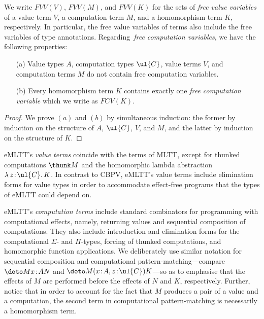 We write $FVV(V)$, $FVV(M)$, and $FVV(K)$ 
for the sets of \emph{free value variables} of a value term $V$, a computation term $M$, and a homomorphism term $K$, respectively. In particular, the free value variables of terms also include the free variables of type annotations. Regarding\, \emph{free computation variables}, we have the following properties:

\begin{proposition}
\mbox{}
\begin{enumerate}
\item[(a)] Value types $A$, computation types $\ul{C}$, value terms $V$, and computation terms $M$ do not contain free computation variables.
\item[(b)] Every homomorphism term $K$ contains exactly one \emph{free computation variable} which we write  as $FCV(K)$.
\end{enumerate}
\end{proposition}

\begin{proof}
We prove $(a)$ and $(b)$ by simultaneous induction: the former by induction on the structure of $A$, $\ul{C}$, $V$, and $M$, and the latter by induction on the structure of $K$.
\end{proof}

eMLTT's \emph{value terms} coincide with the terms of MLTT, except for thunked computations 
$\thunk M$ and the homomorphic lambda abstraction $ \lambda\, z \!:\! \ul{C} .\, K$. 
In contrast to CBPV, eMLTT's value terms include elimination forms for value types  
in order to accommodate effect-free programs that the types of eMLTT could depend on.

eMLTT's \emph{computation terms} include standard combinators for programming with computational effects, namely, returning values and sequential composition of computations. They also include introduction and elimination forms for the computational $\Sigma$- and $\Pi$-types, forcing of thunked computations, and homomorphic function applications. 
We deliberately use similar notation for sequential composition and computational pattern-matching---compare $\doto M {x \!:\! A} {} N$ and $\doto M {(x \!:\! A, z \!:\! \ul{C})} {} K$---so as to emphasise that  the effects of $M$ are performed before the effects of $N$ and $K$, respectively. Further, notice that in order to account for the fact that $M$ produces a pair of a value and a computation, the second term in computational pattern-matching is necessarily a homomorphism term. 

